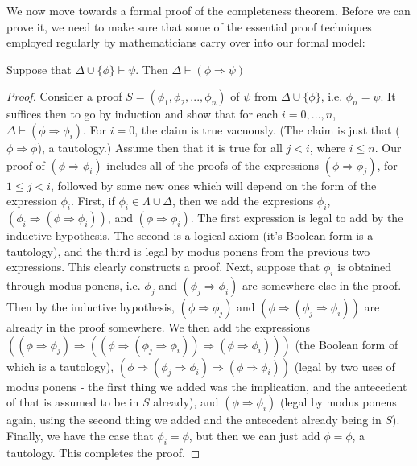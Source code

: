 \par We now move towards a formal proof of the completeness theorem. Before we can prove it, we need to make sure that some of the essential proof techniques employed regularly by mathematicians carry over into our formal model:
\begin{theorem}
    Suppose that $\Delta \cup \{\phi\} \vdash \psi$. Then $\Delta \vdash (\phi \Rightarrow \psi)$
\end{theorem}
\begin{proof}
    Consider a proof $S = (\phi_1,\phi_2,...,\phi_n)$ of $\psi$ from $\Delta \cup \{\phi\}$, i.e. $\phi_n  = \psi$. It suffices then to go by induction and show that for each $i = 0,...,n$, $\Delta \vdash (\phi \Rightarrow \phi_i)$. For $i=0$, the claim is true vacuously. (The claim is just that ($\phi \Rightarrow \phi$), a tautology.) Assume then that it is true for all $j < i$, where $i \leq n$. Our proof of $(\phi \Rightarrow \phi_i)$ includes all of the proofs of the expressions $(\phi \Rightarrow \phi_j)$, for $1\leq j < i$, followed by some new ones which will depend on the form of the expression $\phi_i$. First, if $\phi_i \in \Lambda \cup \Delta$, then we add the expresions $\phi_i$, $(\phi_i \Rightarrow (\phi \Rightarrow \phi_i))$, and $(\phi \Rightarrow \phi_i)$. The first expression is legal to add by the inductive hypothesis. The second is a logical axiom (it's Boolean form is a tautology), and the third is legal by modus ponens from the previous two expressions. This clearly constructs a proof. Next, suppose that $\phi_i$ is obtained through modus ponens, i.e. $\phi_j$ and $(\phi_j \Rightarrow \phi_i)$ are somewhere else in the proof. Then by the inductive hypothesis, $(\phi \Rightarrow \phi_j)$ and $(\phi \Rightarrow (\phi_j \Rightarrow \phi_i))$ are already in the proof somewhere. We then add the expressions $((\phi \Rightarrow \phi_j) \Rightarrow ((\phi \Rightarrow (\phi_j \Rightarrow \phi_i)) \Rightarrow (\phi \Rightarrow \phi_i)))$ (the Boolean form of which is a tautology), $(\phi \Rightarrow (\phi_j \Rightarrow \phi_i) \Rightarrow (\phi \Rightarrow \phi_i))$ (legal by two uses of modus ponens - the first thing we added was the implication, and the antecedent of that is assumed to be in $S$ already), and $(\phi \Rightarrow \phi_i)$ (legal by modus ponens again, using the second thing we added and the antecedent already being in $S$). Finally, we have the case that $\phi_i = \phi$, but then we can just add $\phi = \phi$, a tautology. This completes the proof.
\end{proof}

